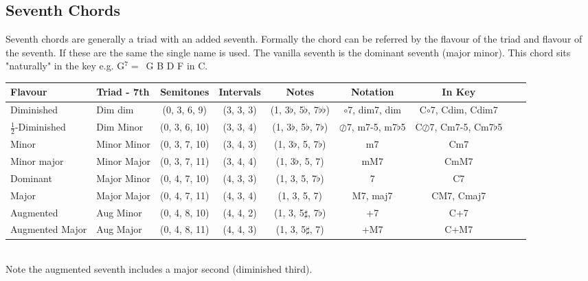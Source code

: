 \documentclass[a4paper]{scrartcl}
\begin{document}
\subsection{Seventh Chords}
Seventh chords are generally a triad with an added seventh. Formally the chord can be referred by the flavour of the triad and flavour of the seventh. If these are the same the single name is used. The vanilla seventh is the dominant seventh (major minor). This chord sits "naturally" in the key e.g. G$^{7} = $\ G B D F in C.\\
\begin{tabular}
{| l | l | c | c | c | c | c | c | c |} \hline
Flavour & Triad - 7th & Semitones & Intervals & Notes & Notation & In Key \\ \hline
Diminished & Dim dim & (0, 3, 6, 9) & (3, 3, 3) & (1, 3$\flat$, 5$\flat$, 7$\flat\flat$) & $\circ$7, dim7, dim & C$\circ$7, Cdim, Cdim7 \\ \hline
$\frac{1}{2}$-Diminished & Dim Minor & (0, 3, 6, 10) & (3, 3, 4) & (1, 3$\flat$, 5$\flat$, 7$\flat$)  & $\oslash$7, m7-5, m7$\flat$5 & C$\oslash$7, Cm7-5, Cm7$\flat$5 \\ \hline
Minor & Minor Minor & (0, 3, 7, 10) & (3, 4, 3) & (1, 3$\flat$, 5, 7$\flat$) & m7 & Cm7 \\ \hline
Minor major & Minor Major & (0, 3, 7, 11) & (3, 4, 4) & (1, 3$\flat$, 5, 7) & mM7 & CmM7  \\ \hline
Dominant & Major Minor & (0, 4, 7, 10) & (4, 3, 3) & (1, 3, 5, 7$\flat$)  & 7 & C7 \\ \hline
Major & Major Major & (0, 4, 7, 11) & (4, 3, 4) & (1, 3, 5, 7)  & M7, maj7 & CM7, Cmaj7 \\ \hline
Augmented & Aug Minor & (0, 4, 8, 10) & (4, 4, 2) & (1, 3, 5$\sharp$, 7$\flat$) & +7 & C+7 \\ \hline
Augmented Major & Aug Major & (0, 4, 8, 11) & (4, 4, 3) & (1, 3, 5$\sharp$, 7)   & +M7 & C+M7 \\ \hline
\end{tabular} \\
Note the augmented seventh includes a major second (diminished third). \\
\end{document}
